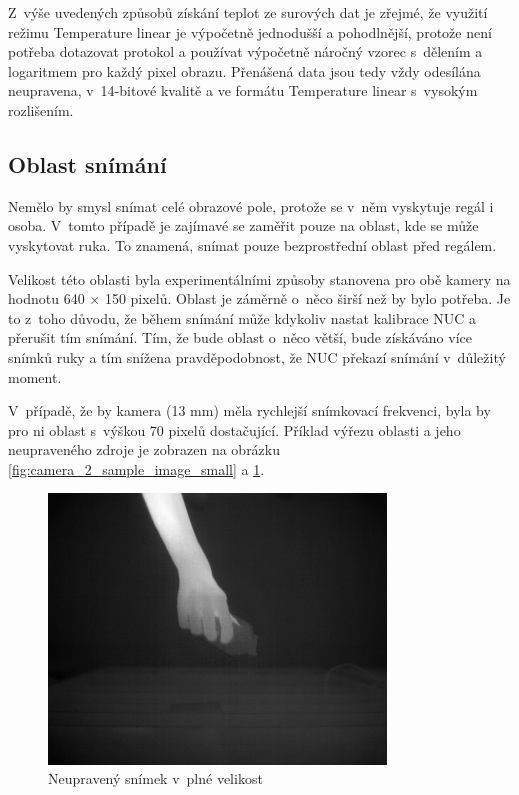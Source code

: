    Z~výše uvedených způsobů získání teplot ze surových dat je zřejmé, že využití režimu Temperature linear je výpočetně jednodušší a pohodlnější, protože není potřeba dotazovat protokol a používat výpočetně náročný vzorec s~dělením a logaritmem pro každý pixel obrazu.   
    Přenášená data jsou tedy vždy odesílána neupravena, v~14-bitové kvalitě a ve formátu Temperature linear s~vysokým rozlišením.
    
	\subsection{Oblast snímání}
  	Nemělo by smysl snímat celé obrazové pole, protože se v~něm vyskytuje regál i osoba. V~tomto případě je zajímavé se zaměřit pouze na oblast, kde se může vyskytovat ruka. To znamená, snímat pouze bezprostřední oblast před regálem.

      Velikost této oblasti byla experimentálními způsoby stanovena pro obě kamery na hodnotu 640 $\times$ 150 pixelů. Oblast je záměrně o~něco širší než by bylo potřeba. Je to z~toho důvodu, že během snímání může kdykoliv nastat kalibrace NUC a přerušit tím snímání. Tím, že bude oblast o~něco větší, bude získáváno více snímků ruky a tím snížena pravděpodobnost, že NUC překazí snímání v~důležitý moment. 
      
      V~případě, že by kamera (13 mm) měla rychlejší snímkovací frekvenci, byla by pro ni oblast s~výškou 70 pixelů dostačující. Příklad výřezu oblasti a jeho neupraveného zdroje je zobrazen na obrázku \ref{fig:camera_2_sample_image_small} a \ref{fig:camera_2_sample_image_full}.
    
    \begin{figure}[h]
      \centering
      \includegraphics[width=0.8\textwidth]{images/camera_2_sample_image_full.jpg}
      \caption{Neupravený snímek v~plné velikost}
      \label{fig:camera_2_sample_image_full}
    \end{figure}  

